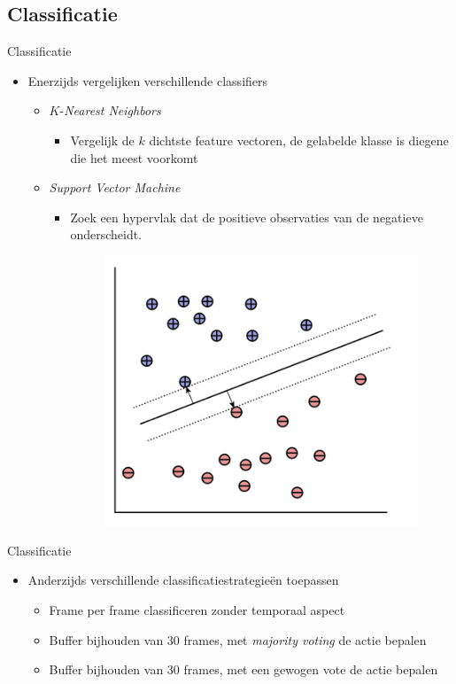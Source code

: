 \documentclass[]{beamer}
\begin{document}
	\subsection{Classificatie}
	\begin{frame}{Classificatie}
		\begin{itemize}
			\item Enerzijds vergelijken verschillende classifiers
			\begin{itemize}
				\item $K$-\textit{Nearest Neighbors}
				\begin{itemize}
					\item Vergelijk de $k$ dichtste feature vectoren, de gelabelde klasse is diegene die het meest voorkomt
				\end{itemize}
				\item \textit{Support Vector Machine}
				\begin{itemize}
					\item Zoek een hypervlak dat de positieve observaties van de negatieve onderscheidt.
					\begin{figure}[ht]
						\centering
						\includegraphics[width=0.5\linewidth]{svm}
					\end{figure}
				\end{itemize}

			\end{itemize}
		\end{itemize}
	\end{frame}
	\begin{frame}{Classificatie}
		\begin{itemize}
			\item Anderzijds verschillende classificatiestrategieën toepassen
			\begin{itemize}
				\item Frame per frame classificeren zonder temporaal aspect
				\item Buffer bijhouden van 30 frames, met \textit{majority voting} de actie bepalen
				\item Buffer bijhouden van 30 frames, met een gewogen vote de actie bepalen
			\end{itemize}
		\end{itemize}
	\end{frame}
\end{document}
